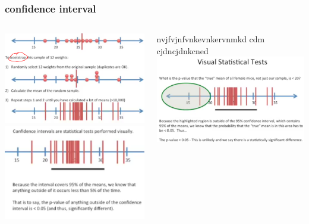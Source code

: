 \documentclass{beamer}
\begin{document}
\begin{frame}\frametitle{confidence interval}
	\begin{columns}
		\begin{column}{0.33\textwidth}
			\includegraphics[scale=0.2]{figs/conf1}\\
			\includegraphics[scale=0.2]{figs/conf2}
		\end{column}
		\begin{column}{0.33\textwidth}
			nvjfvjnfvnkevnkervnmkd cdm cjdncjdnkcned\\
			\includegraphics[scale=0.2]{figs/conf4}

\end{column}
\end{columns}
\end{frame}
\end{document}

